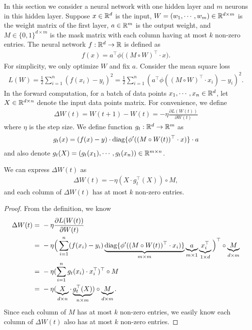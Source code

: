 In this section we consider a neural network with one hidden layer and $m$ neurons in this hidden layer. Suppose $x\in\mathbb{R}^{d}$ is the input, $W = (w_1, \cdots, w_m)\in \mathbb{R}^{d \times m}$ is the weight matrix of the first layer, $a \in \mathbb{R}^m$ is the output weight,  and $M \in \{0,1\}^{d\times m}$ is the mask matrix with each column having at most $k$ non-zero entries. The neural network $f: \mathbb{R}^d \rightarrow \mathbb{R}$ is defined as
\begin{align*}
f(x) = a^{\top} \phi \Big( ( M \circ W )^\top \cdot x  \Big).
\end{align*}
For simplicity, we only optimize $W$ and fix $a$. Consider the mean square loss
\begin{align*}
L(W) = \frac{1}{2} \sum_{i=1}^n ( f(x_i) - y_i )^2 = \frac{1}{2} \sum_{i=1}^n ( a^\top \phi((M\circ W)^\top \cdot x_i) - y_i )^2 .
\end{align*}
In the forward computation, for a batch of data points $x_1, \cdots, x_n \in \mathbb{R}^d$, let $X \in \mathbb{R}^{d \times n}$ denote the input data points matrix.
For convenience, we define
\begin{align*}
    \Delta W(t) = W(t+1) - W(t) = -\eta \frac{\partial L(W(t))}{\partial W(t)}
\end{align*}
where $\eta$ is the step size. We define function $g_t: \mathbb{R}^d \rightarrow \mathbb{R}^m$ as 
\begin{align*}
    g_t(x) = ( f(x) -y )\cdot \mathrm{diag}\{\phi'( (M \circ W(t))^\top\cdot  x)\} \cdot a
\end{align*}
and also denote $g_t(X) = (g_t(x_1), \cdots, g_t(x_n))\in\mathbb{R}^{m\times n}$.
\begin{lemma}\label{lem:Delta_W}
We can express $\Delta W(t)$ as
\begin{align*}
    \Delta W(t) = - \eta (X\cdot g^\top_t(X))\circ M,
\end{align*}
and each column of $\Delta W(t)$ has at most $k$ non-zero entries.
\end{lemma}
\begin{proof}
    From the definition, we know
    \begin{align*}
        \Delta W(t) = & ~ -\eta \frac{\partial L(W(t))}{\partial W(t)} \\
        = & ~ -\eta\Big(\sum_{i=1}^{n}(f(x_i) - y_i)  \underbrace{ \mathrm{diag}\{\phi'( (M \circ W(t))^\top\cdot x_i)\} }_{ m \times m }\underbrace{ a }_{m \times 1}  \underbrace{ x_i^{\top} }_{1 \times d}  \Big)^\top \circ \underbrace{M}_{d\times m} \\
        = & ~ -\eta (\sum_{i=1}^n g_t(x_i) \cdot x_i^\top )^\top \circ M\\
        = & ~ -\eta(\underbrace{X}_{d \times n} \cdot \underbrace{ g^\top_t(X) }_{n \times m} ) \circ \underbrace{M}_{d\times m}.
    \end{align*}
    Since each column of $M$ has at most $k$ non-zero entries, we easily know each column of $\Delta W(t)$ also has at most $k$ non-zero entries.
\end{proof}




